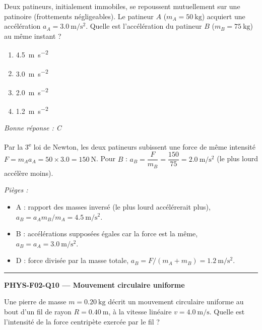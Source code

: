 \documentclass[11pt,a4paper]{article}
\newcommand{\vv}[1]{\vec{#1}}\newcommand{\ds}{\displaystyle}
\begin{document}
Deux patineurs, initialement immobiles, se repoussent mutuellement sur une patinoire (frottements négligeables). Le patineur $A$ ($m_A=\qty{50}{\kilogram}$) acquiert une accélération $a_A=\qty{3.0}{\metre\per\second\squared}$. Quelle est l'accélération du patineur $B$ ($m_B=\qty{75}{\kilogram}$) au même instant ?
\begin{center}
\end{center}
\begin{enumerate}[label=\Alph*)]
\item \qty{4.5}{\metre\per\second\squared}
\item \qty{3.0}{\metre\per\second\squared}
\item \qty{2.0}{\metre\per\second\squared}
\item \qty{1.2}{\metre\per\second\squared}
\end{enumerate}
\textit{Bonne réponse : C}\par
Par la 3\textsuperscript{e} loi de Newton, les deux patineurs subissent une force de même intensité $F=m_A a_A=50\times\num{3.0}=\qty{150}{\newton}$. Pour $B$ : $a_B=\dfrac{F}{m_B}=\dfrac{150}{75}=\qty{2.0}{\metre\per\second\squared}$ (le plus lourd accélère moins).\par
\textit{Pièges :}
\begin{itemize}
\item A : rapport des masses inversé (le plus lourd accélérerait plus), $a_B=a_A m_B/m_A=\qty{4.5}{\metre\per\second\squared}$.
\item B : accélérations supposées égales car la force est la même, $a_B=a_A=\qty{3.0}{\metre\per\second\squared}$.
\item D : force divisée par la masse totale, $a_B=F/(m_A+m_B)=\qty{1.2}{\metre\per\second\squared}$.
\end{itemize}
\vspace{8pt}\hrule\vspace{8pt}
\noindent\textbf{PHYS-F02-Q10 --- Mouvement circulaire uniforme}\par
Une pierre de masse $m=\qty{0.20}{\kilogram}$ décrit un mouvement circulaire uniforme au bout d'un fil de rayon $R=\qty{0.40}{\metre}$, à la vitesse linéaire $v=\qty{4.0}{\metre\per\second}$. Quelle est l'intensité de la force centripète exercée par le fil ?
\end{document}
